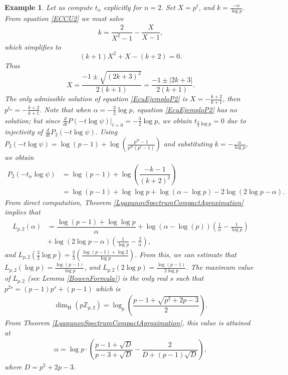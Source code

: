\documentclass[11pt]{amsart}
\newtheorem{example}{Example}
\theoremstyle{remark}
\numberwithin{equation}{section}
\newcommand{\Z}{\mathbb{Z}}
\begin{document}
\begin{example}
 Let us compute $t_\alpha$ explicitly for $n=2.$
 Set $X=p^t$, and $k=\frac{-\alpha}{\log p}$. From equation \eqref{ECCU2} we must solve
 \begin{align}\label{EcuEjemploP2}
     k=\dfrac{2}{X^2-1}-\dfrac{X}{X-1},
 \end{align}
 which simplifies to $$(k+1)X^2+X-(k+2)=0.$$ Thus
 $$X=\dfrac{-1\pm\sqrt{(2k+3)^2}}{2(k+1)}=\dfrac{-1\pm |2k+3|}{2(k+1)}.$$
The only admissible solution of equation \eqref{EcuEjemploP2} is $X=-\frac{k+2}{k+1}$, then $p^{t_\alpha}=-\frac{k+2}{k+1}$. Note that when $\alpha=-\frac{3}{2}\log p$, equation \eqref{EcuEjemploP2} has no solution; but since $\frac{d}{dt}P(-t\log\psi)|_{t=0}=-\frac{3}{2}\log p$, we obtain $t_{\frac{3}{2}\log p}=0$ due to injectivity of $\frac{d}{dt}P_{2}(-t\log \psi)$. Using $P_{2}(-t\log \psi)=\log(p-1)+\log\left(\frac{p^{2t}-1}{p^{2t}(p^{t}-1)}\right)$ and substituting $k=-\frac{\alpha}{\log p }$, we obtain
 \begin{align*}
     P_{2}(-t_{\alpha}\log \psi ) &=\log(p-1)+\log\left(\dfrac{-k-1}{(k+2)^{2}}\right)\\
     &=\log(p-1)+\log \log p+\log(\alpha-\log p)-2\log(2\log p-\alpha).
 \end{align*}
 From direct computation, Theorem \ref{LyapunovSpectrumCompactAproximation} implies that
 \begin{align*}
     L_{p,2}(\alpha)&=\dfrac{\log(p-1)+\log \log p}{\alpha}+\log(\alpha-\log(p))\left(\frac{1}{\alpha}-\frac{1}{\log p}\right)\\
     &+\log(2\log p-\alpha)\left(\frac{1}{\log p}-\frac{2}{\alpha}\right),
 \end{align*}and $L_{p,2}(\frac{3}{2}\log p)=\frac{2}{3}\left(\frac{\log(p-1)+\log 2}{\log p}\right)$.
 From this, we can estimate that $L_{p,2}(\log p)=\frac{\log(p-1)}{\log p}$, and $L_{p,2}(2\log p)=\frac{\log(p-1)}{2\log p}$. The maximum value of $L_{p,2}$ (see Lemma \ref{BowenFormula}) is the only real $s$ such that $p^{2s}=(p-1)p^{s}+(p-1)$ which is 
 \begin{align*}
     \dim_{\mathrm H}(p\Z _{p,2})=\log_{p}\left(\dfrac{p-1+\sqrt{p^{2}+2p-3}}{2}\right).
 \end{align*} From Theorem \ref{LyapunovSpectrumCompactAproximation}, this value is attained at 
 \begin{align*}
     \alpha=\log p \cdot\left(\dfrac{p-1+\sqrt{D}}{p-3+\sqrt{D}}-\dfrac{2}{D+(p-1)\sqrt{D}}\right),
 \end{align*} where $D=p^{2}+2p-3$.
\end{example}
\end{document}

